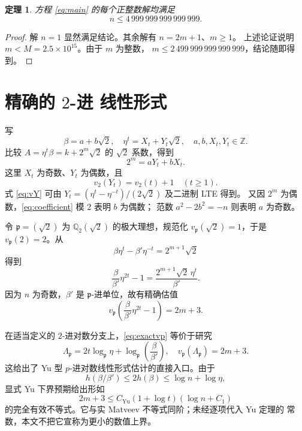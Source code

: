 \documentclass[11pt,a4paper]{ctexart}
\newtheorem{theorem}{定理}
\theoremstyle{remark}
\newcommand{\Q}{\mathbb Q}
\newcommand{\Z}{\mathbb Z}
\newcommand{\vp}{v_{\mathfrak p}}
\begin{document}
\begin{theorem}\label{thm:bound}
方程 \eqref{eq:main} 的每个正整数解均满足
\[
 \boxed{n\le4\,999\,999\,999\,999\,999}.
\]
\end{theorem}
\begin{proof}
解 \(n=1\) 显然满足结论。其余解有 \(n=2m+1\)、\(m\ge1\)。
上述论证说明 \(m<M=2.5\times10^{15}\)。由于 \(m\) 为整数，
\(m\le2\,499\,999\,999\,999\,999\)，结论随即得到。
\end{proof}

\section{精确的 \texorpdfstring{\(2\)-进}{2-adic} 线性形式}

写
\begin{equation}\label{eq:abXY}
 \beta=a+b\sqrt2,\quad
 \eta^t=X_t+Y_t\sqrt2,\quad a,b,X_t,Y_t\in\Z.
\end{equation}
比较 \(A=\eta^t\beta=k+2^m\sqrt2\) 的 \(\sqrt2\) 系数，得到
\begin{equation}\label{eq:coefficient}
 \boxed{2^m=aY_t+bX_t}.
\end{equation}
这里 \(X_t\) 为奇数、\(Y_t\) 为偶数，且
\begin{equation}\label{eq:vY}
 v_2(Y_t)=v_2(t)+1\quad(t\ge1).
\end{equation}
式 \eqref{eq:vY} 可由
\(Y_t=(\eta^t-\eta^{-t})/(2\sqrt2)\) 及二进制 LTE 得到。
又因 \(2^m\) 为偶数，\eqref{eq:coefficient} 模 \(2\) 表明 \(b\) 为偶数；
范数 \(a^2-2b^2=-n\) 则表明 \(a\) 为奇数。

令 \(\mathfrak p=(\sqrt2)\) 为 \(\Q_2(\sqrt2)\) 的极大理想，规范化
\(\vp(\sqrt2)=1\)，于是 \(\vp(2)=2\)。从
\[
 \beta\eta^t-\beta'\eta^{-t}=2^{m+1}\sqrt2
\]
得到
\begin{equation}\label{eq:padic-product}
 \frac{\beta}{\beta'}\eta^{2t}-1
 =\frac{2^{m+1}\sqrt2\,\eta^t}{\beta'}.
\end{equation}
因为 \(n\) 为奇数，\(\beta'\) 是 \(\mathfrak p\)-进单位，故有精确估值
\begin{equation}\label{eq:exactvp}
 \boxed{
 \vp\!\left(\frac{\beta}{\beta'}\eta^{2t}-1\right)=2m+3.}
\end{equation}

在适当定义的 \(2\)-进对数分支上，\eqref{eq:exactvp} 等价于研究
\begin{equation}\label{eq:padic-linear}
 \Lambda_{\mathfrak p}
 =2t\log_{\mathfrak p}\eta
  +\log_{\mathfrak p}\!\left(\frac\beta{\beta'}\right),
 \quad \vp(\Lambda_{\mathfrak p})=2m+3.
\end{equation}
这给出了 Yu 型 \(p\)-进对数线性形式估计的直接入口。由于
\[
 h(\beta/\beta')\le2h(\beta)\le\log n+\log\eta,
\]
显式 Yu 下界预期给出形如
\[
 2m+3\le C_{\mathrm{Yu}}
 (1+\log t)(\log n+C_1)
\]
的完全有效不等式。它与实 Matveev 不等式同阶；未经逐项代入 Yu 定理的
常数，本文不把它宣称为更小的数值上界。
\end{document}
